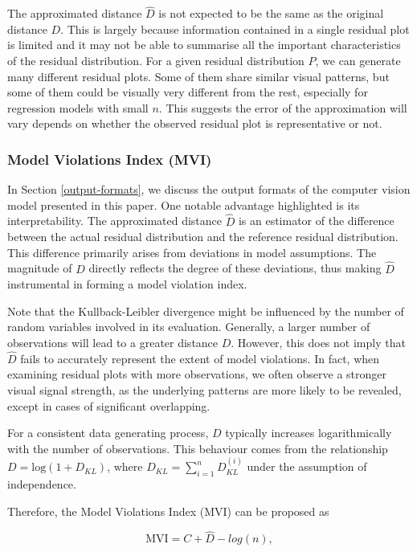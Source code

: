 \documentclass[]{interact}
\theoremstyle{plain}%
\theoremstyle{definition}
\theoremstyle{remark}
\begin{document}
The approximated distance \(\hat{D}\) is not expected to be the same as
the original distance \(D\). This is largely because information
contained in a single residual plot is limited and it may not be able to
summarise all the important characteristics of the residual
distribution. For a given residual distribution \(P\), we can generate
many different residual plots. Some of them share similar visual
patterns, but some of them could be visually very different from the
rest, especially for regression models with small \(n\). This suggests
the error of the approximation will vary depends on whether the observed
residual plot is representative or not.

\subsubsection{Model Violations Index
(MVI)}\label{sec:model-violations-index}

In Section \ref{output-formats}, we discuss the output formats of the
computer vision model presented in this paper. One notable advantage
highlighted is its interpretability. The approximated distance
\(\hat{D}\) is an estimator of the difference between the actual
residual distribution and the reference residual distribution. This
difference primarily arises from deviations in model assumptions. The
magnitude of \(D\) directly reflects the degree of these deviations,
thus making \(\hat{D}\) instrumental in forming a model violation index.

Note that the Kullback-Leibler divergence might be influenced by the
number of random variables involved in its evaluation. Generally, a
larger number of observations will lead to a greater distance \(D\).
However, this does not imply that \(\hat{D}\) fails to accurately
represent the extent of model violations. In fact, when examining
residual plots with more observations, we often observe a stronger
visual signal strength, as the underlying patterns are more likely to be
revealed, except in cases of significant overlapping.

For a consistent data generating process, \(D\) typically increases
logarithmically with the number of observations. This behaviour comes
from the relationship \(D = \text{log}(1 + D_{KL})\), where
\(D_{KL} = \sum_{i=1}^{n}D_{KL}^{(i)}\) under the assumption of
independence.

Therefore, the Model Violations Index (MVI) can be proposed as

\begin{equation}
\label{eq:mvi}
\text{MVI} = C + \hat{D} - log(n),
\end{equation}
\end{document}
